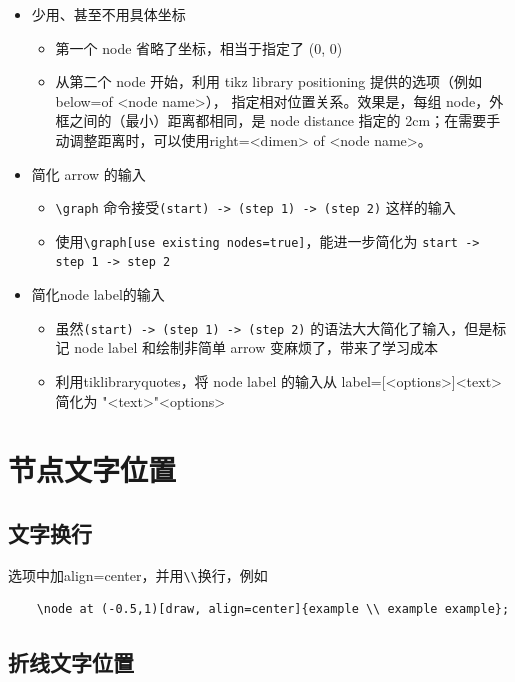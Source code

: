 \begin{itemize}
  \item 少用、甚至不用具体坐标
    \begin{itemize}
      \item 第一个 node 省略了坐标，相当于指定了 (0, 0)
      \item 从第二个 node 开始，利用 tikz library positioning 提供的选项（例如 below=of <node name>）， 指定相对位置关系。效果是，每组 node，外框之间的（最小）距离都相同，是 node distance 指定的 2cm；在需要手动调整距离时，可以使用right=<dimen> of <node name>。
    \end{itemize}
  \item 简化 arrow 的输入
    \begin{itemize}
      \item \verb|\graph| 命令接受\verb|(start) -> (step 1) -> (step 2)| 这样的输入
      \item 使用\verb|\graph[use existing nodes=true]|，能进一步简化为 \verb|start -> step 1 -> step 2|
    \end{itemize}
  \item 简化node label的输入
    \begin{itemize}
      \item  虽然\verb|(start) -> (step 1) -> (step 2)| 的语法大大简化了输入，但是标记 node label 和绘制非简单 arrow 变麻烦了，带来了学习成本
      \item 利用tiklibrary{quotes}，将 node label 的输入从 label={[<options>]<text>} 简化为 "<text>"<options>
    \end{itemize}
\end{itemize}

\section{节点文字位置}

\subsection{文字换行}

选项中加align=center，并用\verb|\\|换行，例如

\begin{lstlisting}
    \node at (-0.5,1)[draw, align=center]{example \\ example example};
\end{lstlisting}

\subsection{折线文字位置}

